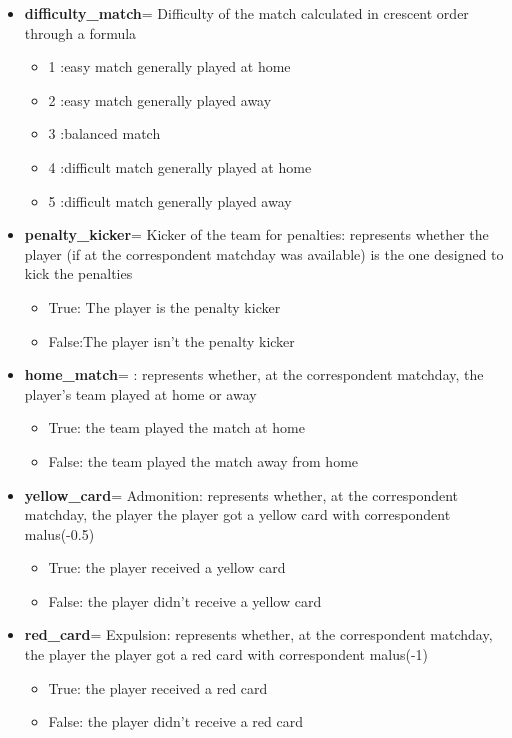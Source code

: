 \documentclass[a4paper,10pt]{report}
\begin{document}
\begin{itemize}
    \item \textbf{difficulty_match}= Difficulty of the match calculated in crescent order through a formula
    \begin{itemize}
        \item 1 :easy match generally played at home
        \item 2 :easy match generally played away
        \item 3 :balanced match
        \item 4 :difficult match generally played at home
        \item 5 :difficult match generally played away
    \end{itemize}
    
    \item \textbf{penalty_kicker}= Kicker of the team for penalties: represents whether the player (if at the correspondent matchday was available) is the one designed to kick the penalties
    \begin{itemize}
        \item True: The player is the penalty kicker
        \item False:The player isn't the penalty kicker
    \end{itemize}
    
    \item \textbf{home_match}= : represents whether, at the correspondent matchday, the player's team played at home or away
    \begin{itemize}
        \item True: the team played the match at home
        \item False: the team played the match away from home
     \end{itemize}
     
    \item \textbf{yellow_card}= Admonition: represents whether, at the correspondent matchday, the player the player got a yellow card with correspondent malus(-0.5)
    \begin{itemize}
        \item True: the player received a yellow card
        \item False: the player didn't receive a yellow card
    \end{itemize}
    
    \item \textbf{red_card}= Expulsion: represents whether, at the correspondent matchday, the player the player got a red card with correspondent malus(-1)
    \begin{itemize}
        \item True: the player received a red card
        \item False: the player didn't receive a red card
    \end{itemize}
    

\end{itemize}
\end{document}
